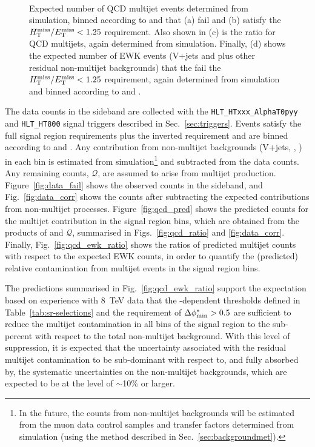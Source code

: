 \begin{figure}[!h]
{  } \\
  \caption{Expected number of QCD multijet events determined from
    simulation, binned according to \njet and \scalht that (a) fail
    and (b) satisfy the $\mbox{$\mbox{$H_{\rm T}^{\rm miss}$} / \mbox{$E_\text{T}^{\rm miss}$}$} < 1.25$ requirement. Also shown in
    (c) is the ratio \rmhtmet for QCD multijets, again determined from
    simulation. Finally, (d) shows the expected number of EWK events
    (V+jets and \ttbar plus other residual non-multijet backgrounds)
    that the fail the $\mbox{$\mbox{$H_{\rm T}^{\rm miss}$} / \mbox{$E_\text{T}^{\rm miss}$}$} < 1.25$ requirement, again determined
    from simulation and binned according to \njet and \scalht.}
  \label{fig:qcd_plots2}
\end{figure}

The data counts in the \mhtmet sideband are collected with the
\verb!HLT_HTxxx_AlphaT0pyy!  and \verb!HLT_HT800! signal triggers
described in Sec.~\ref{sec:triggers}. Events satisfy the full signal
region requirements plus the inverted \mhtmet requirement and are
binned according to \njet and \scalht. Any contribution from
non-multijet backgrounds (V+jets, \ttbar, \etc) in each bin is
estimated from simulation\footnote{In the future, the counts from
  non-multijet backgrounds will be estimated from the muon data
  control samples and transfer factors determined from simulation
  (using the method described in Sec.~\ref{sec:backgroundmet}).} and
subtracted from the data counts. Any remaining counts, $\mathcal{Q}$,
are assumed to arise from multijet production.
Figure~\ref{fig:data_fail} shows the observed counts in the \mhtmet
sideband, and Fig.~\ref{fig:data_corr} shows the counts after
subtracting the expected contributions from non-multijet processes.
Figure~\ref{fig:qcd_pred} shows the predicted counts for the multijet
contribution in the signal region bins, which are obtained from the
products of \rmhtmet and $\mathcal{Q}$, summarised in
Figs.~\ref{fig:qcd_ratio} and \ref{fig:data_corr}. Finally,
Fig.~\ref{fig:qcd_ewk_ratio} shows the ratios of predicted multijet
counts with respect to the expected EWK counts, in order to quantify
the (predicted) relative contamination from multijet events in the
signal region bins.

The predictions summarised in Fig.~\ref{fig:qcd_ewk_ratio} support the
expectation based on experience with 8~TeV data that the \HT-dependent
\alphat thresholds defined in Table~\ref{tab:sr-selections} and the
requirement of $\mbox{$\Delta\phi^{*}_{\rm min}$} > 0.5$ are sufficient to reduce the multijet
contamination in all bins of the signal region to the sub-percent with
respect to the total non-multijet background. With this level of
suppression, it is expected that the uncertainty associated with the
residual multijet contamination to be sub-dominant with respect to,
and fully absorbed by, the systematic uncertainties on the non-multijet
backgrounds, which are expected to be at the level of $\sim$10\% or
larger. 
